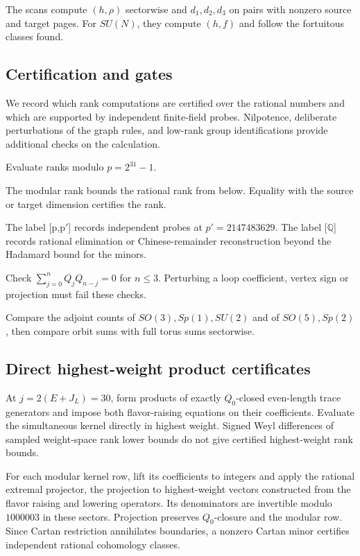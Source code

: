 \documentclass[11pt]{article}
\numberwithin{equation}{section}
\numberwithin{figure}{section}
\numberwithin{table}{section}
\begin{document}
The scans compute $(h,\rho)$ sectorwise and $d_1,d_2,d_3$ on pairs with nonzero source and target pages. For $SU(N)$, they compute $(h,f)$ and follow the fortuitous classes found.

\subsection{Certification and gates}\label{sec-E-cert}

We record which rank computations are certified over the rational numbers and which are supported by independent finite-field probes. Nilpotence, deliberate perturbations of the graph rules, and low-rank group identifications provide additional checks on the calculation.

Evaluate ranks modulo $p=2^{31}-1$.

The modular rank bounds the rational rank from below. Equality with the source or target dimension certifies the rank.

The label [p,p$\prime$] records independent probes at $p'=2147483629$. The label [$\mathbb Q$] records rational elimination or Chinese-remainder reconstruction beyond the Hadamard bound for the minors.

Check $\sum_{j=0}^nQ_jQ_{n-j}=0$ for $n\le3$. Perturbing a loop coefficient, vertex sign or projection must fail these checks.

Compare the adjoint counts of $SO(3),Sp(1),SU(2)$ and of $SO(5),Sp(2)$, then compare orbit sums with full torus sums sectorwise.

\subsection{Direct highest-weight product certificates}\label{sec-E-direct-products}

At $j=2(E+J_L)=30$, form products of exactly $Q_0$-closed even-length trace generators and impose both flavor-raising equations on their coefficients. Evaluate the simultaneous kernel directly in highest weight. Signed Weyl differences of sampled weight-space rank lower bounds do not give certified highest-weight rank bounds.

For each modular kernel row, lift its coefficients to integers and apply the rational extremal projector, the projection to highest-weight vectors constructed from the flavor raising and lowering operators. Its denominators are invertible modulo $1000003$ in these sectors. Projection preserves $Q_0$-closure and the modular row. Since Cartan restriction annihilates boundaries, a nonzero Cartan minor certifies independent rational cohomology classes.
\end{document}
